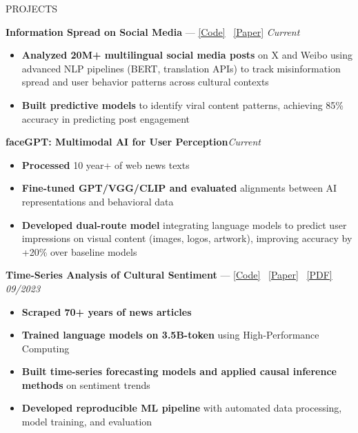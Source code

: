 \documentclass{resume} %
\begin{document}
\begin{rSection}{PROJECTS}

\noindent\textbf{Information Spread on Social Media}  — 
\href{https://osf.io/b7rjk/overview?view_only=569f284163104f37a1b5f5af43d9386b}{[Code]} \ \href{https://www.tandfonline.com/doi/full/10.1080/1369118X.2023.2246551}{[Paper]}
\hfill \textit{Current}
\begin{itemize}[leftmargin=*, noitemsep, topsep=2pt]
    \item \textbf{Analyzed 20M+ multilingual social media posts} on X and Weibo using advanced NLP pipelines (BERT, translation APIs) to track misinformation spread and user behavior patterns across cultural contexts
    \item \textbf{Built predictive models} to identify viral content patterns, achieving 85\% accuracy in predicting post engagement

\end{itemize}

\noindent\textbf{faceGPT: Multimodal AI for User Perception}\hfill \textit{Current}
\begin{itemize}[leftmargin=*, noitemsep, topsep=2pt]
    \item \textbf{Processed} 10 year+ of web news texts
    \item \textbf{Fine-tuned GPT/VGG/CLIP and evaluated} alignments between AI representations and behavioral data
    \item \textbf{Developed dual-route model} integrating language models to predict user impressions on visual content (images, logos, artwork), improving accuracy by +20\% over baseline models
\end{itemize}

\noindent\textbf{Time-Series Analysis of Cultural Sentiment} — 
\href{https://github.com/amberxuqianchen/effort-osf}{[Code]} \ 
\href{https://doi.org/10.1057/s41599-024-03603-3}{[Paper]} \ 
\href{https://www.nature.com/articles/s41599-024-03603-3.pdf}{[PDF]}
\hfill \textit{09/2023}
\begin{itemize}[leftmargin=*, noitemsep, topsep=2pt]
    \item \textbf{Scraped 70+ years of news articles}
    \item \textbf{Trained language models on 3.5B-token} using High-Performance Computing
    \item \textbf{Built time-series forecasting models and applied causal inference methods} on sentiment trends
    \item \textbf{Developed reproducible ML pipeline} with automated data processing, model training, and evaluation
\end{itemize}


\end{rSection}
\end{document}
